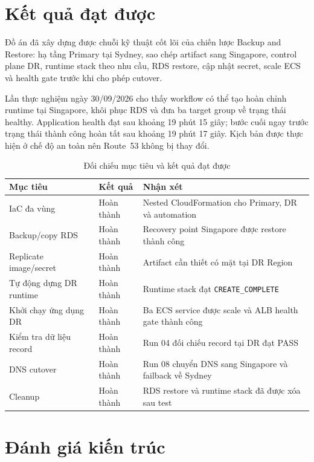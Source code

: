 \section{Kết quả đạt được}

Đồ án đã xây dựng được chuỗi kỹ thuật cốt lõi của chiến lược Backup and Restore: hạ tầng Primary tại Sydney, sao chép artifact sang Singapore, control plane DR, runtime stack theo nhu cầu, RDS restore, cập nhật secret, scale ECS và health gate trước khi cho phép cutover.

Lần thực nghiệm ngày 30/09/2026 cho thấy workflow có thể tạo hoàn chỉnh runtime tại Singapore, khôi phục RDS và đưa ba target group về trạng thái healthy. Application health đạt sau khoảng 19 phút 15 giây; bước cuối ngay trước trạng thái thành công hoàn tất sau khoảng 19 phút 17 giây. Kịch bản được thực hiện ở chế độ an toàn nên Route~53 không bị thay đổi.

\begin{table}[H]
\centering
\caption{Đối chiếu mục tiêu và kết quả đạt được}
\label{tab:objectives}
\begin{tabularx}{\textwidth}{@{}p{4.2cm}p{3cm}X@{}}
\toprule
\textbf{Mục tiêu} & \textbf{Kết quả} & \textbf{Nhận xét} \\
\midrule
IaC đa vùng & Hoàn thành & Nested CloudFormation cho Primary, DR và automation \\
Backup/copy RDS & Hoàn thành & Recovery point Singapore được restore thành công \\
Replicate image/secret & Hoàn thành & Artifact cần thiết có mặt tại DR Region \\
Tự động dựng DR runtime & Hoàn thành & Runtime stack đạt \texttt{CREATE\_COMPLETE} \\
Khởi chạy ứng dụng DR & Hoàn thành & Ba ECS service được scale và ALB health gate thành công \\
Kiểm tra dữ liệu record & Hoàn thành & Run 04 đối chiếu record tại DR đạt PASS \\
DNS cutover & Hoàn thành & Run 08 chuyển DNS sang Singapore và failback về Sydney \\
Cleanup & Hoàn thành & RDS restore và runtime stack đã được xóa sau test \\
\bottomrule
\end{tabularx}
\end{table}

\section{Đánh giá kiến trúc}


